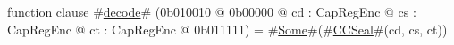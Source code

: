 function clause #\hyperref[sailMIPSzdecode]{decode}# (0b010010 @ 0b00000 @ cd : CapRegEnc @ cs : CapRegEnc @ ct : CapRegEnc @ 0b011111) = #\hyperref[sailMIPSzSome]{Some}#(#\hyperref[sailMIPSzCCSeal]{CCSeal}#(cd, cs, ct))
